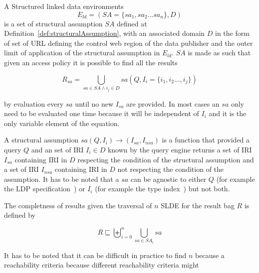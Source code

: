 A Structured linked data environments 
\begin{equation}
E_{ld} = (SA=\{ sa_1, sa_2...sa_n\}, D)
\end{equation}
is a set of structural assumption $SA$  defined at Definition~\ref{def:structuralAssumption},
with an associated domain $D$ in the form of set of URL defining the control web region of the data publisher and the outer limit of application of the structural assumption in $E_{ld}$.
$SA$ is made as such that given an access policy it is possible to find all the results 

\begin{equation}
R_{sa} = \bigcup_{sa \in SA \land i_j \in D} sa(Q, I_{i} = \{i_1, i_2 ..., i_j\}) 
\end{equation}

by evaluation every $sa$ until no new $I_{sa}$ are provided. 
In most cases an $sa$ only need to be evaluated one time because it will be independent of $I_i$ and it is the only variable element of the equation.



\begin{definition}\label{def:structuralAssumption}
   A structural assumption $sa(Q, I_{i}) \rightarrow (I_{sa}, I_{nsa})$ is a function that provided a query $Q$ and an set of IRI $I_{i} \in D$ known by the query engine 
   returns a set of IRI $I_{sa}$ containing IRI in $D$ respecting the condition of the structural assumption and a set of IRI $I_{nsa}$ containing IRI in $D$ not respecting
   the condition of the assumption.
   It has to be noted that a $sa$ can be agnostic to either $Q$ (for example the LDP specification~\cite{Taelman2023}) or $I_i$ (for example the type index~\cite{Taelman2023}) but not both.  
\end{definition}



The completness of results given the traversal of $n$ SLDE for the result bag $R$ is defined by 

\begin{equation}
   R   \sqsubseteq  \biguplus_{i=0}^{n} \bigcup_{sa \in SA_i} sa 
\end{equation}

It has to be noted that it can be difficult in practice to find $n$ because a reachability criteria because different reachability criteria might 



